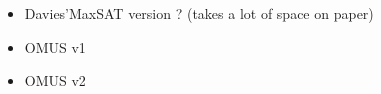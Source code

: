 \begin{itemize}
    \item Davies'MaxSAT version ? (takes a lot of space on paper)
    \item OMUS v1
    \item OMUS v2
\end{itemize}